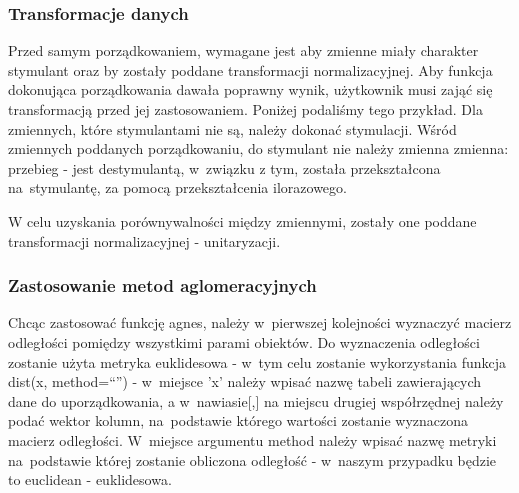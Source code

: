 \documentclass[12pt,a4paper]{report}
\begin{document}
{\subsubsection{Transformacje danych}\label{transformacje-danych}

Przed samym porządkowaniem, wymagane jest aby zmienne miały charakter
stymulant oraz by zostały poddane transformacji normalizacyjnej. Aby
funkcja dokonująca porządkowania dawała poprawny wynik, użytkownik musi
zająć się transformacją przed jej zastosowaniem. Poniżej podaliśmy tego
przykład. Dla zmiennych, które stymulantami nie są, należy dokonać
stymulacji. Wśród zmiennych poddanych porządkowaniu, do stymulant
nie należy zmienna zmienna: przebieg - jest destymulantą, w~związku z
tym, została przekształcona na~stymulantę, za pomocą przekształcenia
ilorazowego.


\begin{Shaded}
\begin{Highlighting}[]
\NormalTok{)}
\end{Highlighting}
\end{Shaded}

W celu uzyskania porównywalności między zmiennymi, zostały one poddane
transformacji normalizacyjnej - unitaryzacji.

\begin{Shaded}
\begin{Highlighting}[]
\end{Highlighting}
\end{Shaded}

\subsubsection{Zastosowanie metod aglomeracyjnych}


Chcąc zastosować funkcję agnes, należy w~pierwszej kolejności wyznaczyć
macierz odległości pomiędzy wszystkimi parami obiektów. Do wyznaczenia
odległości zostanie użyta metryka euklidesowa - w~tym celu zostanie
wykorzystania funkcja dist(x, method=``'') - w~miejsce 'x' należy wpisać
nazwę tabeli zawierających dane do uporządkowania, a w~nawiasie{[},{]}
na miejscu drugiej współrzędnej należy podać wektor kolumn, na~podstawie
którego wartości zostanie wyznaczona macierz odległości. W~miejsce
argumentu method należy wpisać nazwę metryki na~podstawie której zostanie
obliczona odległość - w~naszym przypadku będzie to euclidean -
euklidesowa.

}
\end{document}
